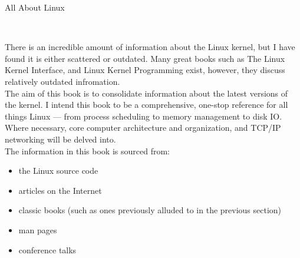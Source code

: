 \documentclass{book}
\begin{document}
    \begin{center}
            {\fontsize{24.88}{5} \selectfont All About Linux}
    \end{center}

    \pagebreak

    \begin{flushleft}
         \\[10pt]
    \end{flushleft}
    \noindent There is an incredible amount of information about the Linux kernel, but I have found
    it is either scattered or outdated. Many great books such as The Linux Kernel Interface,
    and Linux Kernel Programming exist, however, they discuss relatively outdated infromation.  \\

    \noindent The aim of this book is to consolidate information about the latest versions of the kernel.
    I intend this book to be a comprehensive, one-stop reference for all things Linux --- from process
    scheduling to memory management to disk IO. Where necessary, core computer architecture and organization,
    and TCP/IP networking will be delved into. \\

    \noindent The information in this book is sourced from:
        \begin{itemize}
            \setlength{\itemsep}{0.5pt plus 1pt}
            \item the Linux source code
            \item articles on the Internet
            \item classic books (such as ones previously alluded to in the previous section)
            \item man pages
            \item conference talks
        \end{itemize}

    \pagebreak

    \begin{flushleft}
         \\[10pt]
    \end{flushleft}

    \pagebreak

    \begin{flushleft}
         \\[10pt]
    \end{flushleft}

    \pagebreak

    \begin{flushleft}
         \\[10pt]
    \end{flushleft}

    \pagebreak
\end{document}
